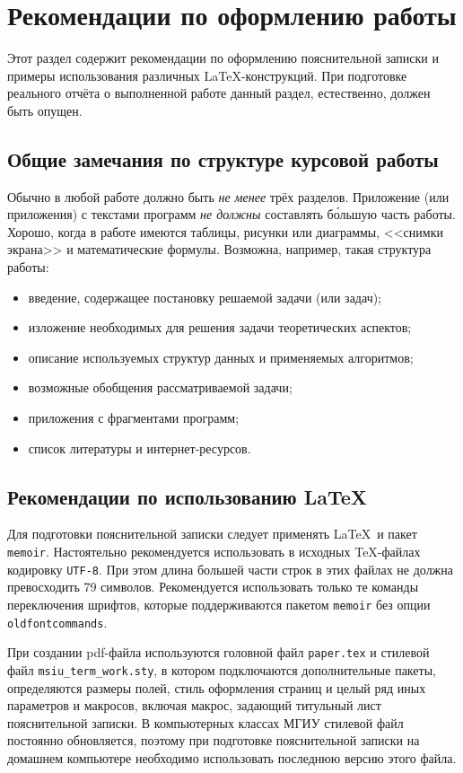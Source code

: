 \section{Рекомендации по оформлению работы}

Этот раздел содержит рекомендации по оформлению пояснительной записки
и примеры использования различных \LaTeX-конструкций. При подготовке
реального отчёта о выполненной работе данный раздел, естественно, должен
быть опущен.

\subsection*{Общие замечания по структуре курсовой работы}

Обычно в любой работе должно быть \emph{не менее} трёх разделов. Приложение
(или приложения) с текстами программ \emph{не должны} составлять б\'{о}льшую
часть работы. Хорошо, когда в работе имеются таблицы, рисунки или диаграммы,
<<снимки экрана>> и математические формулы. Возможна, например, такая 
структура работы:

\begin{itemize}
\item введение, содержащее постановку решаемой задачи (или задач);
\item изложение необходимых для решения задачи теоретических аспектов;
\item описание используемых структур данных и применяемых алгоритмов;
\item возможные обобщения рассматриваемой задачи;
\item приложения с фрагментами программ;
\item список литературы и интернет-ресурсов.
\end{itemize}

\subsection*{Рекомендации по использованию \LaTeX}

Для подготовки пояснительной записки следует применять \LaTeX\ и пакет 
\texttt{memoir}. Настоятельно рекомендуется использовать в исходных 
\TeX-файлах кодировку \texttt{UTF-8}. При этом длина большей части строк в 
этих файлах не должна превосходить 79 символов. Рекомендуется 
использовать только те команды переключения шрифтов, которые поддерживаются
пакетом \verb|memoir| без опции \verb|oldfontcommands|. 

При создании pdf-файла используются головной файл \texttt{paper.tex} и 
стилевой файл \texttt{msiu\_term\_work.sty}, в котором подключаются 
дополнительные 
пакеты, определяются размеры полей, стиль оформления страниц и целый ряд иных 
параметров и макросов, включая макрос, задающий титульный лист пояснительной
записки. В компьютерных классах МГИУ стилевой файл постоянно обновляется,
поэтому при подготовке пояснительной записки на домашнем компьютере необходимо
использовать последнюю версию этого файла.

